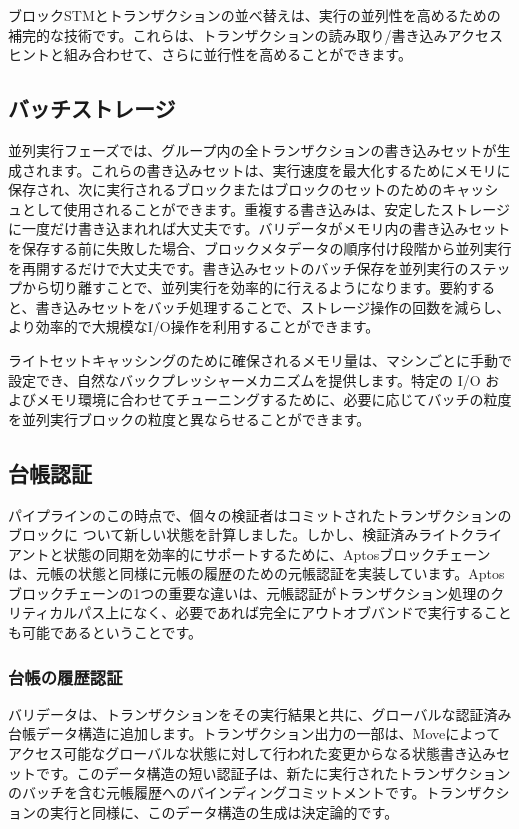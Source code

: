 \documentclass{article}
\begin{document}
ブロックSTMとトランザクションの並べ替えは、実行の並列性を高めるための補完的な技術です。これらは、トランザクションの読み取り/書き込みアクセスヒントと組み合わせて、さらに並行性を高めることができます。

\subsection{バッチストレージ}

並列実行フェーズでは、グループ内の全トランザクションの書き込みセットが生成されます。これらの書き込みセットは、実行速度を最大化するためにメモリに保存され、次に実行されるブロックまたはブロックのセットのためのキャッシュとして使用されることができます。重複する書き込みは、安定したストレージに一度だけ書き込まれれば大丈夫です。バリデータがメモリ内の書き込みセットを保存する前に失敗した場合、ブロックメタデータの順序付け段階から並列実行を再開するだけで大丈夫です。書き込みセットのバッチ保存を並列実行のステップから切り離すことで、並列実行を効率的に行えるようになります。要約すると、書き込みセットをバッチ処理することで、ストレージ操作の回数を減らし、より効率的で大規模なI/O操作を利用することができます。

ライトセットキャッシングのために確保されるメモリ量は、マシンごとに手動で設定でき、自然なバックプレッシャーメカニズムを提供します。特定の I/O およびメモリ環境に合わせてチューニングするために、必要に応じてバッチの粒度を並列実行ブロックの粒度と異ならせることができます。

\subsection{台帳認証}

パイプラインのこの時点で、個々の検証者はコミットされたトランザクションのブロックに ついて新しい状態を計算しました。しかし、検証済みライトクライアントと状態の同期を効率的にサポートするために、Aptosブロックチェーンは、元帳の状態と同様に元帳の履歴のための元帳認証を実装しています。Aptosブロックチェーンの1つの重要な違いは、元帳認証がトランザクション処理のクリティカルパス上になく、必要であれば完全にアウトオブバンドで実行することも可能であるということです。

\subsubsection{台帳の履歴認証}
\label{subsubsec:ledger_history_certification}

バリデータは、トランザクションをその実行結果と共に、グローバルな認証済み台帳データ構造に追加します。トランザクション出力の一部は、Moveによってアクセス可能なグローバルな状態に対して行われた変更からなる状態書き込みセットです。このデータ構造の短い認証子は、新たに実行されたトランザクションのバッチを含む元帳履歴へのバインディングコミットメントです。トランザクションの実行と同様に、このデータ構造の生成は決定論的です。
\end{document}
